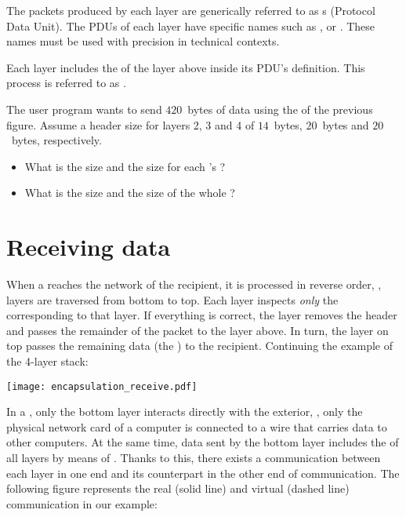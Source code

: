 The packets produced by each layer are generically referred to as s (Protocol Data Unit).
The PDUs of each layer have specific names such as ,  or .
These names must be used with precision in technical contexts.

Each layer includes the  of the layer above inside its PDU's  definition.
This process is referred to as .

\begin{exercise}

The user program wants to send $420$~bytes of data using the  of the previous figure.
Assume a header size for layers 2, 3 and 4 of $14$~bytes, $20$~bytes and $20$~bytes, respectively.
\begin{itemize}
    \item What is the  size and the  size for each 's ?
    \item What is the  size and the  size of the whole ?
\end{itemize}
\end{exercise}

\section{Receiving data}

When a  reaches the network  of the recipient, it is processed in reverse order,
\ie, layers are traversed from bottom to top. Each layer inspects \textit{only} the  corresponding to that layer.
If everything is correct, the layer removes the header and passes the remainder of the packet to the layer above.
In turn, the layer on top passes the remaining data (the ) to the recipient.
Continuing the example of the 4-layer stack:

\begin{center}
\texttt{[image: encapsulation\_receive.pdf]}
\end{center}


In a , only the bottom layer interacts directly with the exterior,
\eg, only the physical network card of a computer is connected to a wire that carries data to other computers.
% 
At the same time, data sent by the bottom layer includes the  of all layers
by means of .
% 
Thanks to this, there exists a  communication between each layer in one end and its counterpart in the other 
end of communication. The following figure represents the real (solid line) and virtual (dashed line) communication 
in our example:

